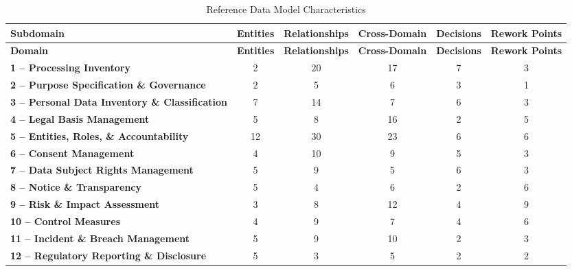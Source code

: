 \documentclass[10pt,letterpaper,twocolumn,twoside]{rho-class/rho}
\begin{document}
\begin{small}
\setlength{\tabcolsep}{4pt}
\renewcommand{\arraystretch}{1.15}

\begin{longtable}{p{}ccccc}
\caption{Reference Data Model Characteristics}
\label{tab:domain-inventory} \\

\hline
\textbf{Subdomain} &
\textbf{Entities} &
\textbf{Relationships} &
\textbf{Cross-Domain} &
\textbf{Decisions} &
\textbf{Rework Points} \\
\hline
\endfirsthead

\hline
\textbf{Domain} &
\textbf{Entities} &
\textbf{Relationships} &
\textbf{Cross-Domain} &
\textbf{Decisions} &
\textbf{Rework Points} \\
\hline
\endhead

\hline
\endfoot

\hline
\endlastfoot

\textbf{1 -- Processing Inventory} & 2 & 20 & 17 & 7 & 3 \\
\textbf{2 -- Purpose Specification \& Governance} & 2 & 5 & 6 & 3 & 1 \\
\textbf{3 -- Personal Data Inventory \& Classification} & 7 & 14 & 7 & 6 & 3 \\
\textbf{4 -- Legal Basis Management} & 5 & 8 & 16 & 2 & 5 \\
\textbf{5 -- Entities, Roles, \& Accountability} & 12 & 30 & 23 & 6 & 6 \\
\textbf{6 -- Consent Management} & 4 & 10 & 9 & 5 & 3 \\
\textbf{7 -- Data Subject Rights Management} & 5 & 9 & 5 & 6 & 3 \\
\textbf{8 -- Notice \& Transparency} & 5 & 4 & 6 & 2 & 6 \\
\textbf{9 -- Risk \& Impact Assessment} & 3 & 8 & 12 & 4 & 9 \\
\textbf{10 -- Control Measures} & 4 & 9 & 7 & 4 & 6 \\
\textbf{11 -- Incident \& Breach Management} & 5 & 9 & 10 & 2 & 3 \\
\textbf{12 -- Regulatory Reporting \& Disclosure} & 5 & 3 & 5 & 2 & 2 \\

\end{longtable}
\end{small}
\end{document}
